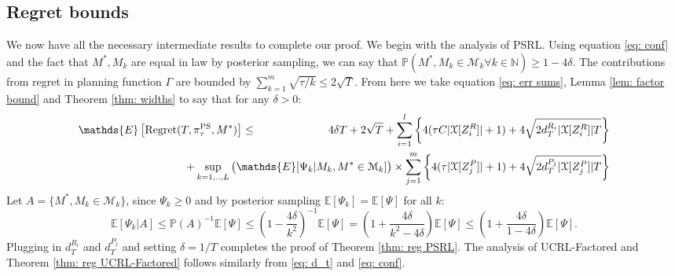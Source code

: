 \documentclass{article}
\newcommand{\Exp}{\mathds{E}}
\newcommand{\Prob}{\mathds{P}}
\newcommand{\Nat}{\mathbb{N}}
\newcommand{\Xc}{\mathcal{X}}
\newcommand{\Mc}{\mathcal{M}}
\begin{document}
\subsection{Regret bounds}
\label{sec: bounds}
We now have all the necessary intermediate results to complete our proof.
We begin with the analysis of PSRL.
Using equation \eqref{eq: conf} and the fact that $M^*,M_k$ are equal in law by posterior sampling, we can say that $\Prob( M^*, M_k \in \Mc_k \forall k \in \Nat) \ge 1-4\delta$.
The contributions from regret in planning function $\Gamma$ are bounded by $ \sum_{k=1}^m \sqrt{\tau/k} \le 2\sqrt{T}$.
From here we take equation \eqref{eq: err sums}, Lemma \ref{lem: factor bound} and Theorem \ref{thm: widths} to say that for any $\delta > 0 $:
\begin{eqnarray*}
	\Exp \left[\mathrm{Regret}(T, \pi^{\rm PS}_{\tau}, M^*) \right] &\le& 4\delta T +2 \sqrt{T} +
		\sum_{i=1}^l \left\{ 4(\tau C |\Xc[Z^R_i]| + 1) + 4\sqrt{2d_T^{R_i} | \Xc[Z^R_i]| T} \right\} \\
	&& \hspace{-25mm} + \sup_{k=1,..,L} \big( \Exp[\Psi_k | M_k, M^* \in \Mc_k] \big) \times \sum_{j=1}^m \left\{ 4(\tau |\Xc[Z^P_j]| + 1) + 4\sqrt{2d_T^{P_j} | \Xc[Z^P_j]| T} \right\}
\end{eqnarray*}
Let $A = \{ M^*, M_k \in \Mc_k \}$, since $\Psi_k \ge 0$ and by posterior sampling $\Exp [ \Psi_k ] = \Exp [\Psi]$ for all $k$: 
$$\Exp[ \Psi_k \vert A  ] \le \Prob(A)^{-1} \Exp[\Psi] \le \left( 1 - \frac{4 \delta}{k^2} \right)^{-1} \Exp[ \Psi ] = \left(1 + \frac{4\delta}{k^2 - 4\delta} \right) \Exp[ \Psi ] \le \left(1 + \frac{4\delta}{1 - 4\delta} \right) \Exp[ \Psi ].$$
Plugging in $d_T^{R_i}$ and $d_T^{P_j}$ and setting $\delta=1/T$ completes the proof of Theorem \ref{thm: reg PSRL}.
The analysis of UCRL-Factored and Theorem \ref{thm: reg UCRL-Factored} follows similarly from \eqref{eq: d_t} and \eqref{eq: conf}.
\end{document}
